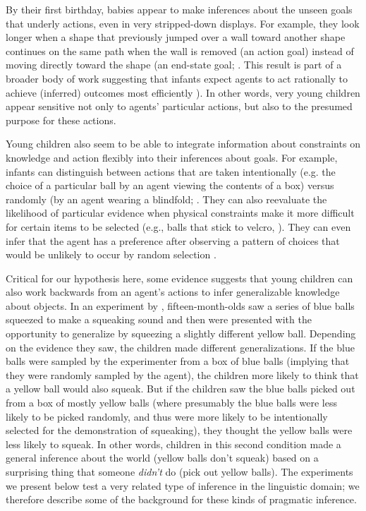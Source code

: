 \documentclass[man]{apa2}
\begin{document}
By their first birthday, babies appear to make inferences about the unseen goals that underly actions, even in very stripped-down displays.  For example, they look longer when a shape that previously jumped over a wall toward another shape continues on the same path when the wall is removed (an action goal) instead of moving directly toward the shape (an end-state goal; . This result is part of a broader body of work suggesting that infants expect agents to act rationally to achieve (inferred) outcomes most efficiently \cite{csibra1998, gergely2003}). In other words, very young children appear sensitive not only to agents' particular actions, but also to the presumed purpose for these actions. 

Young children also seem to be able to integrate information about constraints on knowledge and action flexibly into their inferences about goals. For example, infants can distinguish between actions that are taken intentionally (e.g. the choice of a particular ball by an agent viewing the contents of a box) versus randomly (by an agent wearing a blindfold; \cite{xu2009}.  They can also reevaluate the likelihood of particular evidence when physical constraints make it more difficult for certain items to be selected (e.g., balls that stick to velcro, ).  They can even infer that the agent has a preference after observing a pattern of choices that would be unlikely to occur by random selection \cite{kushnir2010}. 

Critical for our hypothesis here, some evidence suggests that young children can also work backwards from an agent's actions to infer generalizable knowledge about objects. In an experiment by , fifteen-month-olds saw a series of blue balls squeezed to make a squeaking sound and then were presented with the opportunity to generalize by squeezing a slightly different yellow ball. Depending on the evidence they saw, the children made different generalizations. If the blue balls were sampled by the experimenter from a box of blue balls (implying that they were randomly sampled by the agent), the children more likely to think that a yellow ball would also squeak. But if the children saw the blue balls picked out from a box of mostly yellow balls (where presumably the blue balls were less likely to be picked randomly, and thus were more likely to be intentionally selected for the demonstration of squeaking), they thought the yellow balls were less likely to squeak. In other words, children in this second condition made a general inference about the world (yellow balls don't squeak) based on a surprising thing that someone \emph{didn't} do (pick out yellow balls). The experiments we present below test a very related type of inference in the linguistic domain; we therefore describe some of the background for these kinds of pragmatic inference. 
\end{document}
